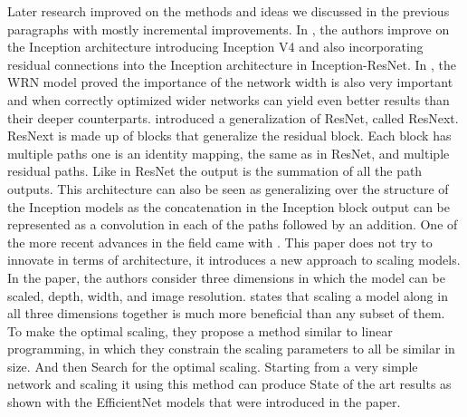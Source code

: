 \documentclass[../main.tex]{subfiles}
\begin{document}
Later research improved on the methods and ideas we discussed in the previous paragraphs with mostly incremental improvements.
In \cite{inceptionv4}, the authors improve on the Inception architecture introducing Inception V4
and also incorporating residual connections into the Inception architecture in Inception-ResNet.
In \cite{wideresnet}, the WRN model proved the importance of the network width is also very important and when correctly optimized
wider networks can yield even better results than their deeper counterparts.
\cite{resnext} introduced a generalization of ResNet, called ResNext.
ResNext is made up of blocks that generalize the residual block. Each block has multiple paths one is an identity mapping,
the same as in ResNet, and multiple residual paths. Like in ResNet the output is the summation of all the path outputs.
This architecture can also be seen as generalizing over the structure of the Inception models as the concatenation in the Inception block output
can be represented as a convolution in each of the paths followed by an addition.
One of the more recent advances in the field came with \cite{effnet}. This paper does not try to innovate in terms of architecture,
it introduces a new approach to scaling models. In the paper, the authors consider three dimensions in which the model can be scaled, depth, width, and image resolution.
\cite{effnet} states that scaling a model along in all three dimensions together is much more beneficial than any subset of them.
To make the optimal scaling, they propose a method similar to linear programming, in which they constrain the scaling parameters to all be similar in size.
And then Search for the optimal scaling.
Starting from a very simple network and scaling it using this method can produce State of the art results
as shown with the EfficientNet models that were introduced in the paper.
\end{document}
